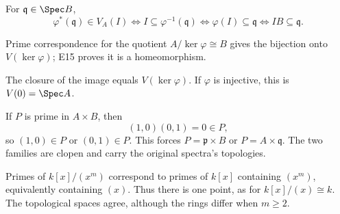\begin{solution}[VI.07.E16]
For $\mathfrak q\in\Spec B$,
\[
\varphi^\ast(\mathfrak q)\in V_A(I)
\iff I\subseteq\varphi^{-1}(\mathfrak q)
\iff \varphi(I)\subseteq\mathfrak q
\iff IB\subseteq\mathfrak q.
\]
\end{solution}

\begin{solution}[VI.07.E17]
Prime correspondence for the quotient $A/\ker\varphi\cong B$ gives the bijection onto
$V(\ker\varphi)$; E15 proves it is a homeomorphism.
\end{solution}

\begin{solution}[VI.07.E18]
The closure of the image equals $V(\ker\varphi)$.  If $\varphi$ is injective, this is
$V(0)=\Spec A$.
\end{solution}

\begin{solution}[VI.07.E19]
If $P$ is prime in $A\times B$, then
\[
(1,0)(0,1)=0\in P,
\]
so $(1,0)\in P$ or $(0,1)\in P$.  This forces $P=\mathfrak p\times B$ or
$P=A\times\mathfrak q$.  The two families are clopen and carry the original spectra's
topologies.
\end{solution}

\begin{solution}[VI.07.E20]
Primes of $k[x]/(x^m)$ correspond to primes of $k[x]$ containing $(x^m)$, equivalently
containing $(x)$.  Thus there is one point, as for $k[x]/(x)\cong k$.  The topological
spaces agree, although the rings differ when $m\ge2$.
\end{solution}
